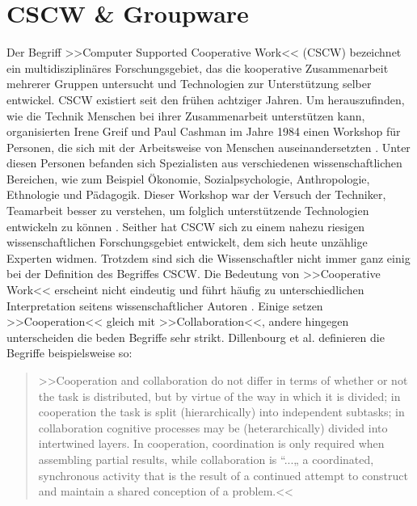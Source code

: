 \chapter{CSCW \& Groupware}\label{ch:CSCWDesign}

	Der Begriff >>Computer Supported Cooperative Work<< (CSCW) bezeichnet ein multidisziplinäres Forschungsgebiet, das die kooperative Zusammenarbeit mehrerer Gruppen untersucht und Technologien zur Unterstützung selber entwickel. CSCW existiert seit den frühen achtziger Jahren. Um herauszufinden, wie die Technik Menschen bei ihrer Zusammenarbeit unterstützen kann, organisierten Irene Greif und Paul Cashman im Jahre 1984 einen Workshop für Personen, die sich mit der Arbeitsweise von Menschen auseinandersetzten \citep{Grudin:1994}. Unter diesen Personen befanden sich Spezialisten aus verschiedenen wissenschaftlichen Bereichen, wie zum Beispiel Ökonomie, Sozialpsychologie, Anthropologie, Ethnologie und Pädagogik. Dieser Workshop war der Versuch der Techniker, Teamarbeit besser zu verstehen, um folglich unterstützende Technologien entwickeln zu können \citep{Grudin:1994, Rama:2006p245}. Seither hat CSCW sich zu einem nahezu riesigen wissenschaftlichen Forschungsgebiet entwickelt, dem sich heute unzählige Experten widmen. Trotzdem sind sich die Wissenschaftler nicht immer ganz einig bei der Definition des Begriffes CSCW. Die Bedeutung von >>Cooperative Work<< erscheint nicht eindeutig und führt häufig zu unterschiedlichen Interpretation seitens wissenschaftlicher Autoren \citep{Gerlicher:2007p241}. Einige setzen >>Cooperation<< gleich mit >>Collaboration<<, andere hingegen unterscheiden die beden Begriffe sehr strikt. Dillenbourg et al. definieren die Begriffe beispielsweise so: 
	
	\medskip\begin{quote}{>>Cooperation and collaboration do not differ in terms of whether or not the task is distributed, but by virtue of the way in which it is divided; in cooperation the task is split (hierarchically) into independent subtasks; in collaboration cognitive processes may be (heterarchically) divided into intertwined layers. In cooperation, coordination is only required when assembling partial results, while collaboration is “...„ a coordinated, synchronous activity that is the result of a continued attempt to construct and maintain a shared conception of a problem.<<} \citep{Dillenbourg:1995} \end{quote}
	
